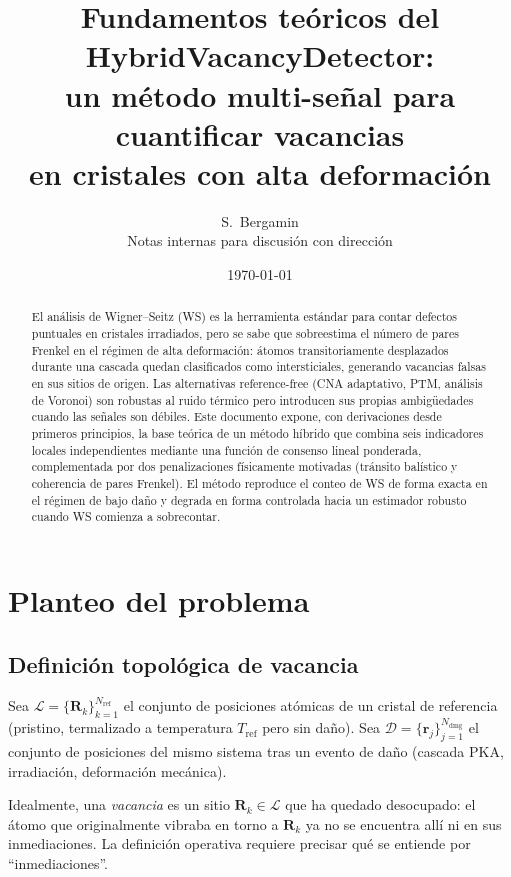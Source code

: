 \documentclass[11pt,a4paper]{article}
\title{\textbf{Fundamentos teóricos del HybridVacancyDetector:\\
un método multi-señal para cuantificar vacancias\\
en cristales con alta deformación}}
\author{S.~Bergamin\\[2pt]\small Notas internas para discusión con dirección}
\date{\today}
\theoremstyle{remark}
\begin{document}
\maketitle

\begin{abstract}
\noindent
El análisis de Wigner--Seitz (WS) es la herramienta estándar para contar
defectos puntuales en cristales irradiados, pero se sabe que sobreestima el
número de pares Frenkel en el régimen de alta deformación: átomos
transitoriamente desplazados durante una cascada quedan clasificados como
intersticiales, generando vacancias falsas en sus sitios de origen. Las
alternativas reference-free (CNA adaptativo, PTM, análisis de Voronoi) son
robustas al ruido térmico pero introducen sus propias ambigüedades cuando
las señales son débiles. Este documento expone, con derivaciones desde
primeros principios, la base teórica de un método híbrido que combina seis
indicadores locales independientes mediante una función de consenso lineal
ponderada, complementada por dos penalizaciones físicamente motivadas
(tránsito balístico y coherencia de pares Frenkel). El método reproduce el
conteo de WS de forma exacta en el régimen de bajo daño y degrada en forma
controlada hacia un estimador robusto cuando WS comienza a sobrecontar.
\end{abstract}

\tableofcontents
\bigskip

\section{Planteo del problema}

\subsection{Definición topológica de vacancia}

Sea $\mathcal{L} = \{\mathbf{R}_k\}_{k=1}^{N_\text{ref}}$ el conjunto de
posiciones atómicas de un cristal de referencia (pristino, termalizado a
temperatura $T_\text{ref}$ pero sin daño). Sea $\mathcal{D} =
\{\mathbf{r}_j\}_{j=1}^{N_\text{dmg}}$ el conjunto de posiciones del mismo
sistema tras un evento de daño (cascada PKA, irradiación, deformación
mecánica).

Idealmente, una \emph{vacancia} es un sitio $\mathbf{R}_k \in \mathcal{L}$
que ha quedado desocupado: el átomo que originalmente vibraba en torno a
$\mathbf{R}_k$ ya no se encuentra allí ni en sus inmediaciones. La
definición operativa requiere precisar qué se entiende por
``inmediaciones''.
\end{document}
